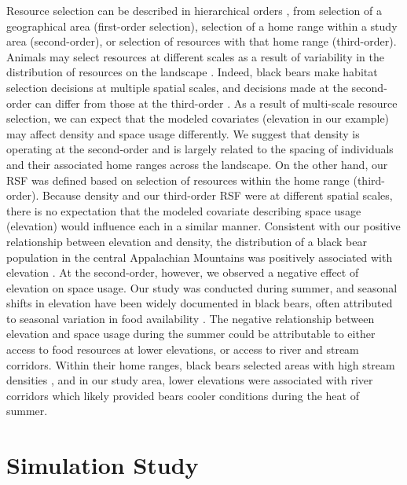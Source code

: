 Resource selection can be described in
hierarchical orders \citep{johnson:1980}, from selection of a geographical
area (first-order selection), selection of a home range within a study
area (second-order), or selection of resources with that home range
(third-order).  Animals may select resources at different scales as a
result of variability in the distribution of resources on the
landscape \citep{mayor_etal:2009}.  Indeed, black bears make habitat
selection decisions at multiple spatial scales, and decisions made at
the second-order can differ from those at the third-order
\citep{lyons_etal:2003, sadeghpour_ginnett:2011}.
  As a result of multi-scale
resource selection, we can expect that the modeled covariates
(elevation in our example) may affect density and space usage
differently.  We suggest that density is operating at the second-order
and is largely related to the spacing of individuals and their
associated home ranges across the landscape.  On the other hand, our RSF was defined
based on selection of resources within the home range (third-order).
Because density and our third-order RSF were at different spatial
scales, there is no expectation that the modeled covariate describing
space usage (elevation) would influence each in a similar manner.
Consistent with our positive relationship between elevation and
density, the distribution of a black bear population in the central
Appalachian Mountains was positively associated with elevation \citep{frary_etal:2011}.
 At the second-order, however, we observed a negative
effect of elevation on space usage.  Our study was conducted during
summer, and seasonal shifts in elevation have been widely documented
in black bears, often attributed to seasonal variation in food
availability \citep{reynolds_beecham:1980,
graber_white:1983}.
 The negative relationship between elevation and space
usage during the summer could be attributable to either access to food
resources at lower elevations, or access to river and stream
corridors.  Within their home ranges, black bears selected areas with
high stream densities \citep{fecske_etal:2002}, and in our study area,
lower elevations were associated with river corridors which likely
provided bears cooler conditions during the heat of summer.





\section{Simulation Study}

